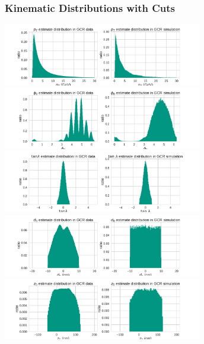 \documentclass[18pt]{beamer}
\begin{document}
    \begin{frame}[allowframebreaks]
    \frametitle{Kinematic Distributions with Cuts}
    \begin{center}
      \includegraphics[width=0.65\textwidth]{figures/distributions/gcr_pt_distribution_cut.pdf}\\
      \includegraphics[width=0.65\textwidth]{figures/distributions/gcr_phi0_distribution_cut.pdf}\\
      \includegraphics[width=0.65\textwidth]{figures/distributions/gcr_tan_lambda_distribution_cut.pdf}\\
      \includegraphics[width=0.65\textwidth]{figures/distributions/gcr_d0_distribution_cut.pdf}\\
      \includegraphics[width=0.65\textwidth]{figures/distributions/gcr_z0_distribution_cut.pdf}

    \end{center}
  \end{frame}
\end{document}
